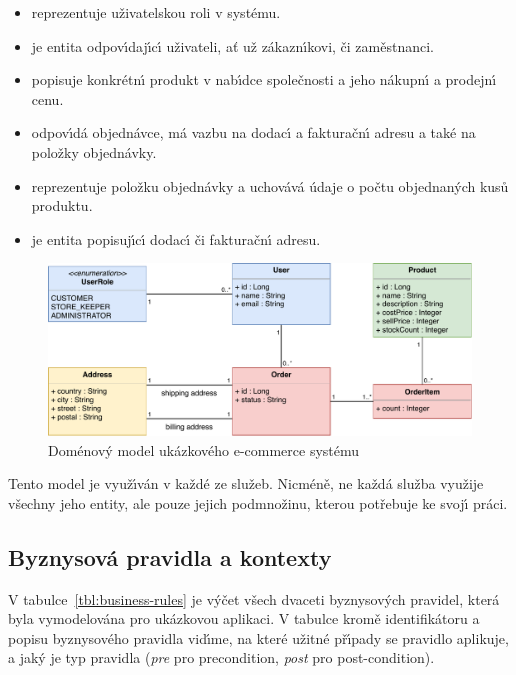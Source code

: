 \begin{itemize}
    \item \textbf{} reprezentuje uživatelskou roli v systému.
    \item \textbf{} je entita odpov\'{\i}daj\'{\i}c\'{\i} uživateli, ať už zákazn\'{\i}kovi, či zaměstnanci.
    \item \textbf{} popisuje konkrétn\'{\i} produkt v nab\'{\i}dce společnosti a jeho nákupn\'{\i} a prodejn\'{\i} cenu.
    \item \textbf{} odpov\'{\i}dá objednávce, má vazbu na dodac\'{\i} a fakturačn\'{\i} adresu a také na položky objednávky.
    \item \textbf{} reprezentuje položku objednávky a uchovává údaje o počtu objednan\'ych kusů produktu.
    \item \textbf{} je entita popisuj\'{\i}c\'{\i} dodac\'{\i} či fakturačn\'{\i} adresu.
\end{itemize}

\begin{figure}[t]
    \centering
    \includegraphics[keepaspectratio=true, width=0.9\linewidth]{figures/example-model.pdf}
    \caption{Doménový model ukázkového e-commerce systému}
    \label{fig:example-model}
\end{figure}

Tento model je využ\'{\i}ván v každé ze služeb. Nicméně, ne každá služba využije všechny jeho entity,
ale pouze jejich podmnožinu, kterou potřebuje ke svoj\'{\i} práci.

\subsection{Byznysová pravidla a kontexty}

V tabulce~\ref{tbl:business-rules} je v\'yčet všech dvaceti byznysov\'ych pravidel, která byla
vymodelována pro ukázkovou aplikaci. V tabulce kromě identifikátoru a popisu byznysového pravidla
vid\'{\i}me, na které užitné př\'{\i}pady se pravidlo aplikuje, a jak\'y je typ pravidla
(\textit{pre} pro precondition, \textit{post} pro post-condition).

